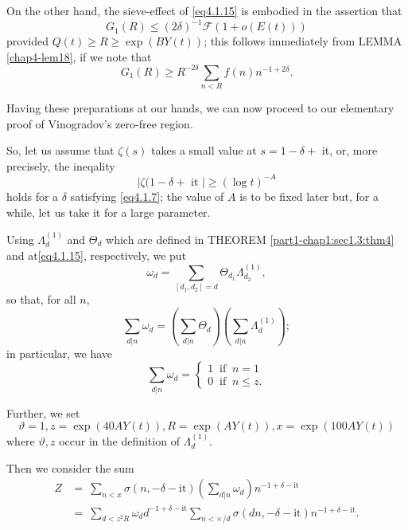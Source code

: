 On the other hand, the sieve-effect of \eqref{eq4.1.15} is embodied in the
assertion that 
{\fontsize{10pt}{12pt}\selectfont
\begin{equation*}
G_1 (R) \leq (2 \delta )^{-1} \mathscr{F} (1 + o(E(t)))
\tag{4.1.17}\label{eq4.1.17} 
\end{equation*}}\relax
provided $Q(t) \geq R \geq \exp (BY(t))$; this follows immediately
from LEM\-MA \ref{chap4-lem18}, if we note that 
$$
G_1 (R) \geq R^{-2 \delta} \sum_{n < R} f(n) n^{-1 + 2\delta}.
$$

Having these preparations at our hands, we can now proceed to our
elementary proof of Vinogradov's zero-free region. 

So, let us assume that $\zeta (s) $ takes a small value at $s = 1 -
\delta + $ it, or, more precisely, the ineqality 
\begin{equation*}
  |\zeta (1- \delta + \text{ it } | \geq (\log t)^{-A}
  \tag{4.1.18}\label{eq4.1.18} 
\end{equation*}
holds for a $\delta$ satisfying \eqref{eq4.1.7}; the value of $A$ is to be
fixed later but, for a while, let us take it for a large parameter. 

Using $\Lambda_d^{(1)}$ and $\Theta_d$ which are defined in THEOREM
\ref{part1-chap1:sec1.3:thm4} and at\break \eqref{eq4.1.15}, respectively, we put 
$$
\omega_d = \sum_{[d_1, d_2] = d} \Theta_{d_1} \Lambda^{(1)}_{d_2}, 
$$ 
so that, for all $n$,
\begin{equation*}
  \sum_{d | n} \omega_d = \left(\sum_{d | n} \Theta_d \right) \left( \sum_{d | n}
  \Lambda_d^{(1)}\right); \tag{4.1.19} \label{eq4.1.19}
\end{equation*}\pageoriginale
in particular, we have
\begin{equation*}
  \sum_{d | n} \omega_d = 
  \begin{cases}
    1 ~  \text{ if } ~ n = 1\\
    0 ~ \text{ if } ~ n \leq z.
  \end{cases} \tag{4.1.20}\label{eq4.1.20}
\end{equation*}

Further, we set
$$
\vartheta = 1, z = \exp (40 AY(t)), R = \exp (AY(t)), x = \exp
(100 AY(t))
$$ 
where $\vartheta, z$ occur in the definition of
$\Lambda_d^{(1)}$. 

Then we consider the sum
\begin{align*}
  Z & = ~ \sum_{n < x} \sigma (n, - \delta - \text{it}) \left(\sum_{d | n}
  \omega_d \right) n^{-1+ \delta - \text{it}}\\ 
  & = ~ \sum_{d < z^2 R} \omega_d d^{-1 + \delta - \text {it}} \sum_{n
    < \times /d} \sigma (dn, - \delta - \text{it}) n^{-1 + \delta -
    \text{it}}. 
\end{align*}

